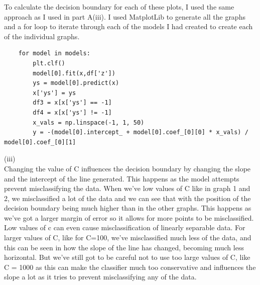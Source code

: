 \documentclass[10pt,a4paper]{article}
\begin{document}
\begin{figure}[h]
\qquad
{}
\end{figure}
To calculate the decision boundary for each of these plots, I used the same approach as I used in part A(iii). I used MatplotLib to generate all the graphs and a for loop to iterate through each of the models I had created to create each of the individual graphs.
\begin{verbatim}
    for model in models:
        plt.clf()
        model[0].fit(x,df['z'])
        ys = model[0].predict(x)
        x['ys'] = ys
        df3 = x[x['ys'] == -1]
        df4 = x[x['ys'] != -1]
        x_vals = np.linspace(-1, 1, 50)
        y = -(model[0].intercept_ + model[0].coef_[0][0] * x_vals) / model[0].coef_[0][1]
\end{verbatim}
(iii)
\\
Changing the value of C influences the decision boundary by changing the slope and the intercept of the line generated. This happens as the model attempts prevent misclassifying the data. When we've low values of C like in graph 1 and 2, we misclassified a lot of the data and we can see that with the position of the decision boundary being much higher than in the other graphs. This happens as we've got a larger margin of error so it allows for more points to be misclassified. Low values of c can even cause misclassification of linearly separable data. For larger values of C, like for C=100, we've misclassified much less of the data, and this can be seen in how the slope of the line has changed, becoming much less horizontal. But we've still got to be careful not to use too large values of C, like C = 1000 as this can make the classifier much too conservative and influences the slope a lot as it tries to prevent misclassifying any of the data.
\end{document}
